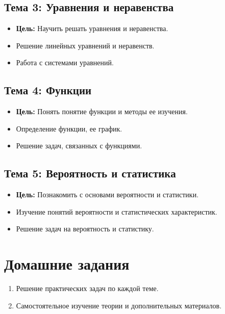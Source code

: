 \documentclass{article}
\begin{document}
\subsection{Тема 3: Уравнения и неравенства}
\begin{itemize}
    \item \textbf{Цель:} Научить решать уравнения и неравенства.
    \item Решение линейных уравнений и неравенств.
    \item Работа с системами уравнений.
\end{itemize}

\subsection{Тема 4: Функции}
\begin{itemize}
    \item \textbf{Цель:} Понять понятие функции и методы ее изучения.
    \item Определение функции, ее график.
    \item Решение задач, связанных с функциями.
\end{itemize}

\subsection{Тема 5: Вероятность и статистика}
\begin{itemize}
    \item \textbf{Цель:} Познакомить с основами вероятности и статистики.
    \item Изучение понятий вероятности и статистических характеристик.
    \item Решение задач на вероятность и статистику.
\end{itemize}

\section{Домашние задания}
\begin{enumerate}
    \item Решение практических задач по каждой теме.
    \item Самостоятельное изучение теории и дополнительных материалов.
\end{enumerate}
\end{document}
